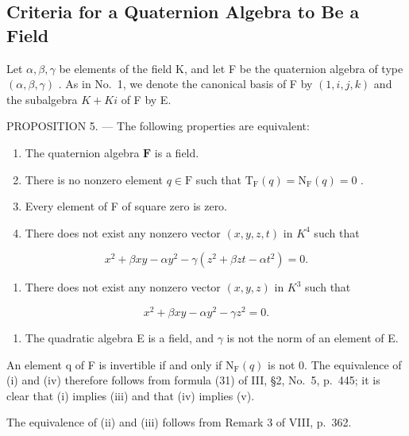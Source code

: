 \subsection{Criteria for a Quaternion Algebra to Be a Field}

Let \(\alpha,\beta,\gamma\) be elements of the field K, and let F be the quaternion algebra of type \((\alpha,\beta,\gamma)\) . As in No.~1, we denote the canonical basis of F by \((1,i,j,k)\) and the subalgebra \(K+Ki\) of F by E.

PROPOSITION 5. --- The following properties are equivalent:

\begin{enumerate}
\def\labelenumi{(\roman{enumi})}
\item
  The quaternion algebra \(\mathbf{F}\) is a field.
\item
  There is no nonzero element \(q \in \mathrm{F}\) such that \(\mathrm{T}_{\mathrm{F}}(q) = \mathrm{N}_{\mathrm{F}}(q) = 0\) .
\item
  Every element of F of square zero is zero.
\item
  There does not exist any nonzero vector \((x,y,z,t)\) in \(K^{4}\) such that
\end{enumerate}

\[
x ^ {2} + \beta x y - \alpha y ^ {2} - \gamma (z ^ {2} + \beta z t - \alpha t ^ {2}) = 0.
\]

\begin{enumerate}
\def\labelenumi{(\alph{enumi})}
\setcounter{enumi}{21}
\tightlist
\item
  There does not exist any nonzero vector \((x,y,z)\) in \(K^{3}\) such that
\end{enumerate}

\[
x ^ {2} + \beta x y - \alpha y ^ {2} - \gamma z ^ {2} = 0.
\]

\begin{enumerate}
\def\labelenumi{(\roman{enumi})}
\setcounter{enumi}{5}
\tightlist
\item
  The quadratic algebra E is a field, and \(\gamma\) is not the norm of an element of E.
\end{enumerate}

An element q of F is invertible if and only if \(\mathrm{N}_{\mathrm{F}}(q)\) is not 0. The equivalence of (i) and (iv) therefore follows from formula (31) of III, §2, No.~5, p.~445; it is clear that (i) implies (iii) and that (iv) implies (v).

The equivalence of (ii) and (iii) follows from Remark 3 of VIII, p.~362.


